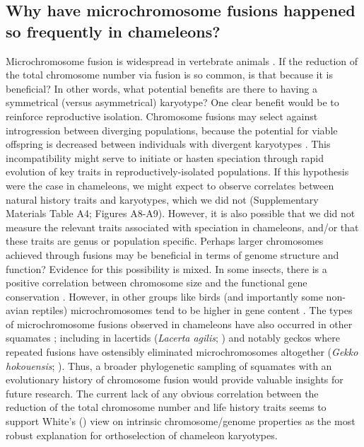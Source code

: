 \documentclass[a4paper, 12pt]{article}
\begin{document}
\subsection{Why have microchromosome fusions happened so frequently in chameleons?}
Microchromosome fusion is widespread in vertebrate animals \citep{waters2021microchromosomes}. 
If the reduction of the total chromosome number via fusion is so common, is that because it is beneficial? In other words, what potential benefits are there to having a symmetrical (versus asymmetrical) karyotype? 
One clear benefit would be to reinforce reproductive isolation. 
Chromosome fusions may select against introgression between diverging populations, because the potential for viable offspring is decreased between individuals with divergent karyotypes \citep{cicconardi2021chromosome}.
This incompatibility might serve to initiate or hasten speciation through rapid evolution of key traits in reproductively-isolated populations. If this hypothesis were the case in chameleons, we might expect to observe correlates between natural history traits and karyotypes, which we did not (Supplementary Materials Table A4; Figures A8-A9). 
However, it is also possible that we did not measure the relevant traits associated with speciation in chameleons, and/or that these traits are genus or population specific.
Perhaps larger chromosomes achieved through fusions may be beneficial in terms of genome structure and function? Evidence for this possibility is mixed. In some insects, there is a positive correlation between chromosome size and the functional gene conservation \citep{cicconardi2021chromosome}. 
However, in other groups like birds (and importantly some non-avian reptiles) microchromosomes tend to be higher in gene content \citep{waters2021microchromosomes}.
The types of microchromosome fusions observed in chameleons have also occurred in other squamates \citep{deakin2016anchoring}; including in lacertids (\textit{Lacerta agilis}; \citealt{srikulnath2014identification}) and notably geckos where repeated fusions have ostensibly eliminated microchromosomes altogether (\textit{Gekko hokouensis}; \citealt{srikulnath2015karyotype}). 
Thus, a broader phylogenetic sampling of squamates with an evolutionary history of chromosome fusion would provide valuable insights for future research. 
The current lack of any obvious correlation between the reduction of the total chromosome number and life history traits seems to support White's (\citeyear{white1973,white1975chromosome}) view on intrinsic chromosome/genome properties as the most robust explanation for orthoselection of chameleon karyotypes.
\end{document}
